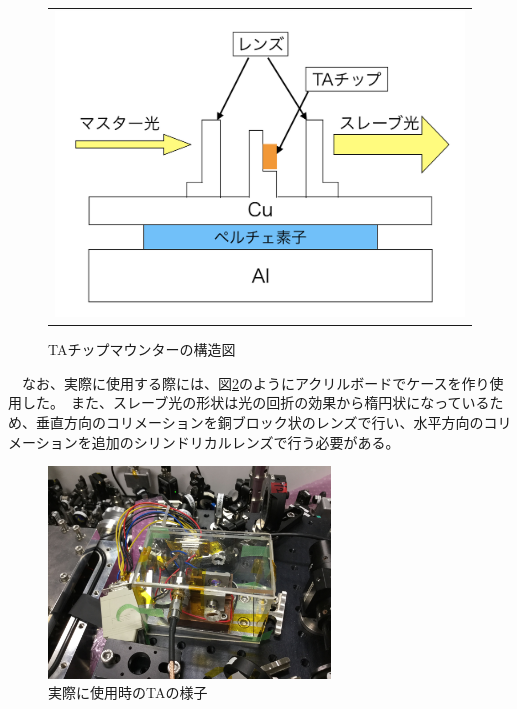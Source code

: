 \documentclass[uplatex, dvipdfmx, a4paper, report, papersize, 11pt]{jsbook}
\begin{document}
\begin{figure}[htpb]
\begin{tabular}{c}
      \begin{minipage}{0.50\hsize}
        \centering
          \includegraphics[keepaspectratio,  scale=0.35,  angle=0]
                          {figures/chapter4/TA_mounter_structure.png}
                          \caption{TAチップマウンターの構造図}
                          \label{TA_mounter_structure}
      \end{minipage}

    \end{tabular}
\end{figure}
\newpage
　なお、実際に使用する際には、図\ref{TA_case}のようにアクリルボードでケースを作り使用した。　また、スレーブ光の形状は光の回折の効果から楕円状になっているため、垂直方向のコリメーションを銅ブロック状のレンズで行い、水平方向のコリメーションを追加のシリンドリカルレンズで行う必要がある。\\
\begin{figure}[htbp]
 \begin{center}
  \includegraphics[width=75mm]{figures/chapter4/TA_case.jpg}
\end{center}
 \caption{実際に使用時のTAの様子}
 \label{TA_case}
\end{figure}
\end{document}
